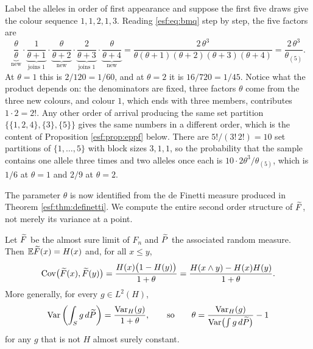 \begin{example}
\label{esf:ex:hoppe}
Label the alleles in order of first appearance and suppose the first five draws give
the colour sequence $1, 1, 2, 1, 3$. Reading \eqref{esf:eq:bmq} step by step, the five
factors are
\[
\underbrace{\frac{\theta}{\theta}}_{\text{new}} \cdot
\underbrace{\frac{1}{\theta+1}}_{\text{joins } 1} \cdot
\underbrace{\frac{\theta}{\theta+2}}_{\text{new}} \cdot
\underbrace{\frac{2}{\theta+3}}_{\text{joins } 1} \cdot
\underbrace{\frac{\theta}{\theta+4}}_{\text{new}}
= \frac{2\,\theta^{3}}{\theta(\theta+1)(\theta+2)(\theta+3)(\theta+4)}
= \frac{2\,\theta^{3}}{\theta_{(5)}} .
\]
At $\theta = 1$ this is $2/120 = 1/60$, and at $\theta = 2$ it is
$16/720 = 1/45$. Notice what the product depends on: the denominators are fixed, three
factors $\theta$ come from the three new colours, and colour $1$, which ends with three
members, contributes $1 \cdot 2 = 2!$. Any other order of arrival producing the same
set partition $\{\{1,2,4\},\{3\},\{5\}\}$ gives the same numbers in a different order,
which is the content of Proposition \ref{esf:prop:eppf} below. There are
$5!/(3!\,2!) = 10$ set partitions of $\{1,\dots,5\}$ with block sizes $3,1,1$, so the
probability that the sample contains one allele three times and two alleles once each
is $10 \cdot 2\theta^{3}/\theta_{(5)}$, which is $1/6$ at $\theta = 1$ and $2/9$ at
$\theta = 2$.
\end{example}

The parameter $\theta$ is now identified from the de Finetti measure produced in
Theorem \ref{esf:thm:definetti}. We compute the entire second order structure of $\widetilde{F}$,
not merely its variance at a point.

\begin{proposition}
\label{esf:prop:cov}
Let $\widetilde{F}$ be the almost sure limit of $F_n$ and $\widetilde{P}$ the associated random
measure. Then $\mathbb{E} \widetilde{F}(x) = H(x)$ and, for all $x \le y$,
\begin{equation}
\operatorname{Cov}\bigl( \widetilde{F}(x), \widetilde{F}(y) \bigr)
= \frac{H(x)\bigl( 1 - H(y) \bigr)}{1 + \theta}
= \frac{H(x \wedge y) - H(x) H(y)}{1 + \theta}.
\label{esf:eq:kernel}
\end{equation}
More generally, for every $g \in L^2(H)$,
\begin{equation}
\operatorname{Var} \left( \int_S g \, d\widetilde{P} \right) = \frac{\operatorname{Var}_H(g)}{1 + \theta},
\qquad \text{so} \qquad
\theta = \frac{\operatorname{Var}_H(g)}{\operatorname{Var}\bigl( \int g \, d\widetilde{P} \bigr)} - 1
\label{esf:eq:thetag}
\end{equation}
for any $g$ that is not $H$ almost surely constant.
\end{proposition}

